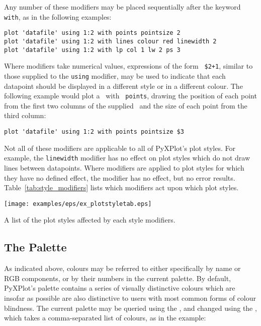 Any number of these modifiers may be placed sequentially after the keyword {\tt
with}, as in the following examples:

\begin{verbatim}
plot 'datafile' using 1:2 with points pointsize 2
plot 'datafile' using 1:2 with lines colour red linewidth 2
plot 'datafile' using 1:2 with lp col 1 lw 2 ps 3
\end{verbatim}

\noindent Where modifiers take numerical values, expressions of the form {\tt
\$2+1}, similar to those supplied to the {\tt using} modifier, may be used to
indicate that each datapoint should be displayed in a different style or in a
different colour. The following example would plot a \datafile\ with {\tt
points}, drawing the position of each point from the first two columns of the
supplied \datafile\ and the size of each point from the third column:
\begin{verbatim}
plot 'datafile' using 1:2 with points pointsize $3
\end{verbatim}

Not all of these modifiers are applicable to all of PyXPlot's plot styles. For
example, the {\tt line\-width} modifier has no effect on plot styles which do
not draw lines between datapoints. Where modifiers are applied to plot styles
for which they have no defined effect, the modifier has no effect, but no error
results.  Table~\ref{tab:style_modifiers} lists which modifiers act upon which
plot styles.

\begin{table}
\centerline{\texttt{[image: examples/eps/ex\_plotstyletab.eps]}}
\caption{A list of the plot styles affected by each style modifiers.}
\label{tab:style_modifiers}
\end{table}

\subsection{The Palette}
\label{sec:palette}

 As indicated above, colours
may be referred to either specifically by name or RGB components, or by their
numbers in the current palette. By default, PyXPlot's palette contains a series
of visually distinctive colours which are insofar as possible are also
distinctive to users with most common forms of colour blindness. The current
palette may be queried using the , and changed using the
, which takes a comma-separated list of colours, as in the
example:

